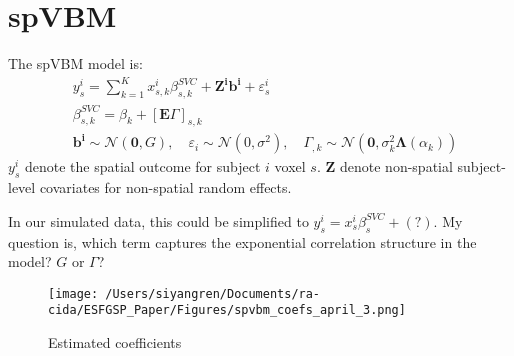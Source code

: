 \documentclass[12pt]{article}
\begin{document}
\section*{spVBM}

The spVBM model is:
\[
    \begin{aligned}
         & y_s^i=\sum_{k=1}^K x_{s, k}^i \beta_{s, k}^{S V C}+\mathbf{Z}^{\mathbf{i}} \mathbf{b}^{\mathbf{i}}+\varepsilon_s^i                                                                                                                      \\
         & \beta_{s, k}^{S V C}=\beta_k+[\mathbf{E} \Gamma]_{s, k}                                                                                                                                                                                 \\
         & \mathbf{b}^{\mathbf{i}} \sim \mathcal{N}(\mathbf{0}, G), \quad \varepsilon_i \sim \mathcal{N}\left(0, \sigma^2\right), \quad \Gamma_{, k} \sim \mathcal{N}\left(\mathbf{0}, \sigma_k^2 \boldsymbol{\Lambda}\left(\alpha_k\right)\right)
    \end{aligned}
\]
\(y_s^i\) denote the spatial outcome for subject \(i\) voxel \(s\). \(\mathbf{Z}\) denote non-spatial subject-level covariates for non-spatial random effects.

In our simulated data, this could be simplified to \(y_s^i = x_s^i \beta_s^{SVC} + (?) \). My question is, which term captures the exponential correlation structure in the model? \(G\) or \(\Gamma\)?

\begin{figure}[ht]
    \centering
    \texttt{[image: /Users/siyangren/Documents/ra-cida/ESFGSP\_Paper/Figures/spvbm\_coefs\_april\_3.png]}
    \caption{Estimated coefficients}
    \label{fig:my_label}
\end{figure}
\end{document}
